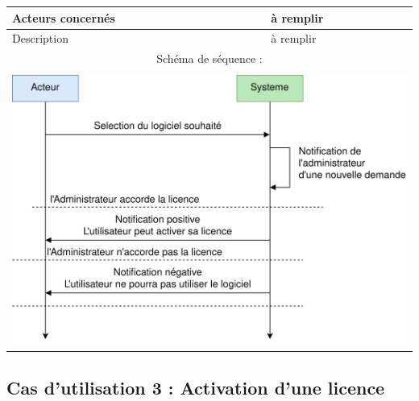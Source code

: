 \begin{table}[!h]
	\centering
	\begin{tabular}{| m{5cm} | m{10cm} |}
		\hline
		    Acteurs concernés & à remplir \\
		\hline
		    Description & à remplir \\
		\hline
		    \multicolumn{2}{|c|}{Schéma de séquence :} \\
		\hline
		    \multicolumn{2}{|c|}{}\\
		    \multicolumn{2}{|c|}{\includegraphics[width=15cm]{main/png/seq_demande.png}} \\
		\hline
	\end{tabular}
	\label{tab:tab2}
\end{table}
\newpage

\subsection{Cas d'utilisation 3 : Activation d'une licence}

